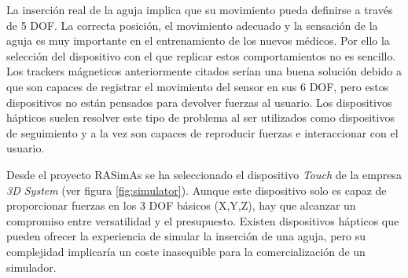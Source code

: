 
La inserción real de la aguja implica que su movimiento pueda definirse a través de 5 \ac{DOF}. La correcta posición, el movimiento adecuado y la sensación de la aguja es muy importante en el entrenamiento de los nuevos médicos. Por ello la selección del dispositivo con el que replicar estos comportamientos no es sencillo. Los \ac{tracker}s mágneticos anteriormente citados serían una buena solución debido a que son capaces de registrar el movimiento del sensor en sus 6 \ac{DOF}, pero estos dispositivos no están pensados para devolver fuerzas al usuario. Los dispositivos hápticos suelen resolver este tipo de problema al ser utilizados como dispositivos de seguimiento y a la vez son capaces de reproducir fuerzas e interaccionar con el usuario.

Desde el proyecto \ac{RASimAs} se ha seleccionado el dispositivo \emph{Touch} de la empresa \emph{3D System}\cite{touch} (ver figura \ref{fig:simulator}). Aunque este dispositivo solo es capaz de proporcionar fuerzas en los 3 \ac{DOF} básicos (X,Y,Z), hay que alcanzar un compromiso entre versatilidad y el presupuesto. Existen dispositivos hápticos que pueden ofrecer la experiencia de simular la inserción de una aguja, pero su complejidad implicaría un coste inasequible para la comercialización de un simulador. %


